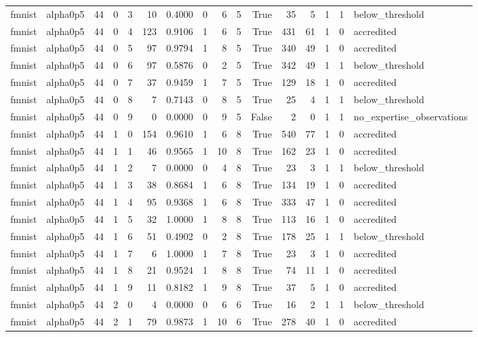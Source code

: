 \begin{tabular}{llrrrrrrrrrrrrrl}
fmnist & alpha0p5 & 44 & 0 & 3 & 10 & 0.4000 & 0 & 6 & 5 & True & 35 & 5 & 1 & 1 & below\_threshold \\
fmnist & alpha0p5 & 44 & 0 & 4 & 123 & 0.9106 & 1 & 6 & 5 & True & 431 & 61 & 1 & 0 & accredited \\
fmnist & alpha0p5 & 44 & 0 & 5 & 97 & 0.9794 & 1 & 8 & 5 & True & 340 & 49 & 1 & 0 & accredited \\
fmnist & alpha0p5 & 44 & 0 & 6 & 97 & 0.5876 & 0 & 2 & 5 & True & 342 & 49 & 1 & 1 & below\_threshold \\
fmnist & alpha0p5 & 44 & 0 & 7 & 37 & 0.9459 & 1 & 7 & 5 & True & 129 & 18 & 1 & 0 & accredited \\
fmnist & alpha0p5 & 44 & 0 & 8 & 7 & 0.7143 & 0 & 8 & 5 & True & 25 & 4 & 1 & 1 & below\_threshold \\
fmnist & alpha0p5 & 44 & 0 & 9 & 0 & 0.0000 & 0 & 9 & 5 & False & 2 & 0 & 1 & 1 & no\_expertise\_observations \\
fmnist & alpha0p5 & 44 & 1 & 0 & 154 & 0.9610 & 1 & 6 & 8 & True & 540 & 77 & 1 & 0 & accredited \\
fmnist & alpha0p5 & 44 & 1 & 1 & 46 & 0.9565 & 1 & 10 & 8 & True & 162 & 23 & 1 & 0 & accredited \\
fmnist & alpha0p5 & 44 & 1 & 2 & 7 & 0.0000 & 0 & 4 & 8 & True & 23 & 3 & 1 & 1 & below\_threshold \\
fmnist & alpha0p5 & 44 & 1 & 3 & 38 & 0.8684 & 1 & 6 & 8 & True & 134 & 19 & 1 & 0 & accredited \\
fmnist & alpha0p5 & 44 & 1 & 4 & 95 & 0.9368 & 1 & 6 & 8 & True & 333 & 47 & 1 & 0 & accredited \\
fmnist & alpha0p5 & 44 & 1 & 5 & 32 & 1.0000 & 1 & 8 & 8 & True & 113 & 16 & 1 & 0 & accredited \\
fmnist & alpha0p5 & 44 & 1 & 6 & 51 & 0.4902 & 0 & 2 & 8 & True & 178 & 25 & 1 & 1 & below\_threshold \\
fmnist & alpha0p5 & 44 & 1 & 7 & 6 & 1.0000 & 1 & 7 & 8 & True & 23 & 3 & 1 & 0 & accredited \\
fmnist & alpha0p5 & 44 & 1 & 8 & 21 & 0.9524 & 1 & 8 & 8 & True & 74 & 11 & 1 & 0 & accredited \\
fmnist & alpha0p5 & 44 & 1 & 9 & 11 & 0.8182 & 1 & 9 & 8 & True & 37 & 5 & 1 & 0 & accredited \\
fmnist & alpha0p5 & 44 & 2 & 0 & 4 & 0.0000 & 0 & 6 & 6 & True & 16 & 2 & 1 & 1 & below\_threshold \\
fmnist & alpha0p5 & 44 & 2 & 1 & 79 & 0.9873 & 1 & 10 & 6 & True & 278 & 40 & 1 & 0 & accredited \\

\end{tabular}
